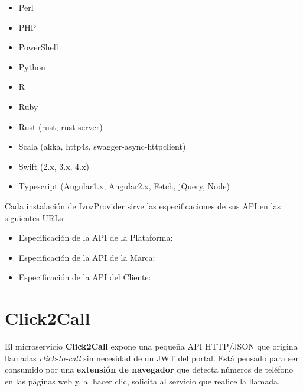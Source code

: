 \documentclass[letterpaper,10pt,spanish]{sphinxmanual}
\begin{document}
\begin{itemize}
\item {} 
Perl

\item {} 
PHP

\item {} 
PowerShell

\item {} 
Python

\item {} 
R

\item {} 
Ruby

\item {} 
Rust (rust, rust-server)

\item {} 
Scala (akka, http4s, swagger-async-httpclient)

\item {} 
Swift (2.x, 3.x, 4.x)

\item {} 
Typescript (Angular1.x, Angular2.x, Fetch, jQuery, Node)

\end{itemize}

Cada instalación de IvozProvider sirve las especificaciones de sus API en las siguientes URLs:
\begin{itemize}
\item {} 
Especificación de la API de la Plataforma: 

\item {} 
Especificación de la API de la Marca: 

\item {} 
Especificación de la API del Cliente: 

\end{itemize}


\chapter{Click2Call}
\label{api_rest/click2call:click2call}\label{api_rest/click2call::doc}\label{api_rest/click2call:id1}
El microservicio \textbf{Click2Call} expone una pequeña API HTTP/JSON que origina llamadas \emph{click-to-call} sin necesidad de un JWT del portal. Está pensado para ser consumido por una \textbf{extensión de navegador} que detecta números de teléfono en las páginas web y, al hacer clic, solicita al servicio que realice la llamada.
\end{document}
